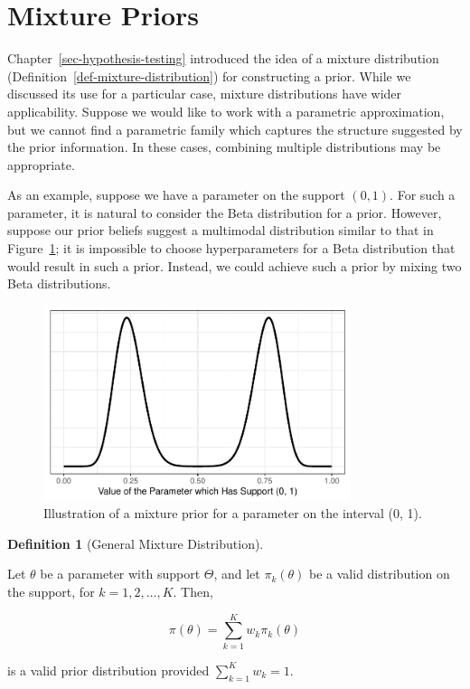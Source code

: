 \documentclass[
  letterpaper,
  DIV=11,
  numbers=noendperiod]{scrreprt}
\theoremstyle{definition}
\newtheorem{definition}{Definition}[chapter]
\theoremstyle{plain}
\theoremstyle{definition}
\theoremstyle{remark}
\begin{document}
\hypertarget{mixture-priors}{%
\section{Mixture Priors}\label{mixture-priors}}

Chapter~\ref{sec-hypothesis-testing} introduced the idea of a mixture
distribution (Definition~\ref{def-mixture-distribution}) for
constructing a prior. While we discussed its use for a particular case,
mixture distributions have wider applicability. Suppose we would like to
work with a parametric approximation, but we cannot find a parametric
family which captures the structure suggested by the prior information.
In these cases, combining multiple distributions may be appropriate.

As an example, suppose we have a parameter on the support \((0, 1)\).
For such a parameter, it is natural to consider the Beta distribution
for a prior. However, suppose our prior beliefs suggest a multimodal
distribution similar to that in Figure~\ref{fig-mixture-prior}; it is
impossible to choose hyperparameters for a Beta distribution that would
result in such a prior. Instead, we could achieve such a prior by mixing
two Beta distributions.

\begin{figure}

{\centering \includegraphics[width=0.8\textwidth,height=\textheight]{./images/fig-mixture-prior-1.pdf}

}

\caption{\label{fig-mixture-prior}Illustration of a mixture prior for a
parameter on the interval (0, 1).}

\end{figure}

\begin{definition}[General Mixture
Distribution]\protect\hypertarget{def-general-mixture-distribution}{}\label{def-general-mixture-distribution}

Let \(\theta\) be a parameter with support \(\Theta\), and let
\(\pi_k(\theta)\) be a valid distribution on the support, for
\(k = 1, 2, \dotsc, K\). Then,

\[\pi(\theta) = \sum_{k=1}^{K} w_k \pi_k(\theta)\]

is a valid prior distribution provided \(\sum_{k=1}^{K} w_k = 1\).

\end{definition}
\end{document}

